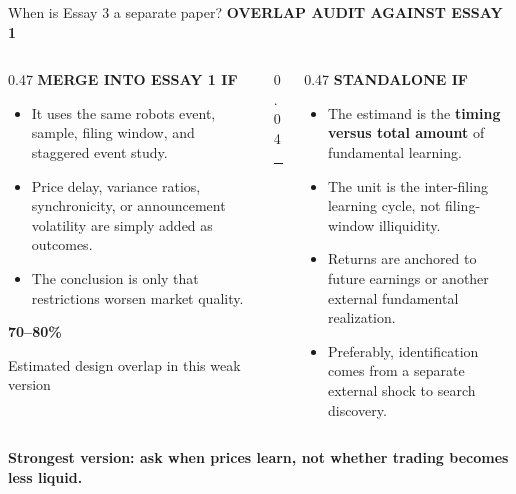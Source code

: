 \documentclass[aspectratio=169,10pt]{beamer}
\newcommand{\eyebrow}[1]{%
  {\color{accent}\fontsize{7.3}{9}\selectfont\bfseries\MakeUppercase{#1}}\par\vspace{0.10cm}%
}
\newcommand{\bodytext}{\fontsize{9.4}{12.1}\selectfont}
\newcommand{\smalltext}{\fontsize{8.1}{10.2}\selectfont}
\newcommand{\metric}[2]{%
  {\color{accent}\fontsize{25}{27}\selectfont\bfseries #1}\par
  {\color{muted}\fontsize{7.7}{9.4}\selectfont #2}%
}
\begin{document}
\begin{frame}[t]{When is Essay 3 a separate paper?}
\eyebrow{Overlap audit against Essay 1}

\begin{columns}[T,onlytextwidth]
  \begin{column}{0.47\textwidth}
    {\color{red}\fontsize{12}{14}\selectfont\bfseries MERGE INTO ESSAY 1 IF}\par\vspace{0.15cm}
    {\bodytext
    \begin{itemize}\setlength\itemsep{0.15cm}
      \item It uses the same robots event, sample, filing window, and staggered event study.
      \item Price delay, variance ratios, synchronicity, or announcement volatility are simply added as outcomes.
      \item The conclusion is only that restrictions worsen market quality.
    \end{itemize}}
    \vspace{0.22cm}
    \metric{70--80\%}{Estimated design overlap in this weak version}
  \end{column}
  \begin{column}{0.04\textwidth}\centering
    {\color{rule}\rule{0.6pt}{4.45cm}}
  \end{column}
  \begin{column}{0.47\textwidth}
    {\color{green}\fontsize{12}{14}\selectfont\bfseries STANDALONE IF}\par\vspace{0.15cm}
    {\bodytext
    \begin{itemize}\setlength\itemsep{0.15cm}
      \item The estimand is the \textbf{timing versus total amount} of fundamental learning.
      \item The unit is the inter-filing learning cycle, not filing-window illiquidity.
      \item Returns are anchored to future earnings or another external fundamental realization.
      \item Preferably, identification comes from a separate external shock to search discovery.
    \end{itemize}}
  \end{column}
\end{columns}

\vspace{0.10cm}
{\smalltext\bfseries\color{accent}Strongest version: ask when prices learn, not whether trading becomes less liquid.}
\end{frame}
\end{document}
